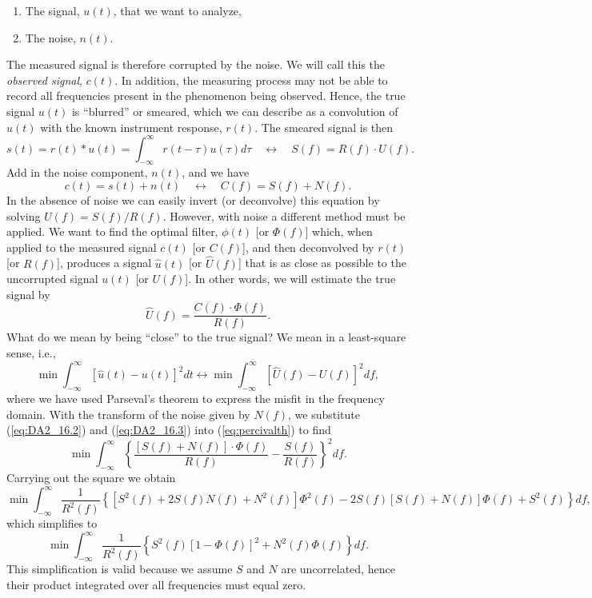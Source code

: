 \begin{enumerate}
\item The signal, $u(t)$, that we want to analyze,
\item The noise, $n(t)$.
\end{enumerate}
The measured signal is therefore corrupted by the noise. We will call this the \emph{observed signal},
$c(t)$. In addition, the measuring process may not be able to record all frequencies present in the phenomenon being observed.
Hence, the true signal $u(t)$ is ``blurred'' or smeared, which we can describe as a convolution
of $u(t)$ with the known instrument response, $r(t)$. The smeared signal is then
\begin{equation}
s(t)=r(t)*u(t)=\int^\infty_{-\infty} r(t-\tau)u(\tau)d \tau \quad \leftrightarrow \quad S(f)= R(f) \cdot U(f).
\end{equation}
Add in the noise component, $n(t)$, and we have
\begin{equation}
c(t)=s(t)+n(t)  \quad \leftrightarrow  \quad C(f)=S(f)+N(f).
\label{eq:DA2_16.2}
\end{equation}
In the absence of noise we can easily invert (or deconvolve) this equation by solving $U (f) =
S(f)/R(f)$. However, with noise a different method must be applied. We want to find
the optimal filter, $\phi(t)$ [or $\Phi(f)$] which, when applied to the measured signal $c(t)$ [or
$C(f)$], and then deconvolved by $r(t)$ [or $R(f)$], produces a signal $\hat{u}(t)$ [or $\hat{U}(f)$] that is as
close as possible to the uncorrupted signal $u(t)$ [or $U (f)$]. In other words, we will
estimate the true signal by
\begin{equation}
\hat{U}(f) = \frac{C(f) \cdot \Phi (f)}{R (f)}.
\label{eq:DA2_16.3}
\end{equation}
What do we mean by being ``close'' to the true signal? We mean in a least-square sense, i.e.,
\begin{equation}
\min \int^\infty _{- \infty} \left [ \hat{u} (t) - u(t) \right ]^2 dt \leftrightarrow \min \int^\infty _{- \infty}
\left [ \hat{U} (f) - U (f) \right ]^2 d f,
\label{eq:percivalth}
\end{equation}
where we have used Parseval's theorem to express the misfit in the frequency domain.
With the transform of the noise given by $N(f)$, we substitute (\ref{eq:DA2_16.2}) and (\ref{eq:DA2_16.3})
into (\ref{eq:percivalth}) to find
$$
\min \int^\infty _{- \infty} \left \{
\frac{\left [ S(f) + N (f) \right ] \cdot \Phi (f)}{R (f) }
- \frac{S (f)}{R(f)} \right \} ^2 d f.
$$
Carrying out the square we obtain
$$
\min \int^\infty _{- \infty}
\frac{1}{ R^2 (f)}
\left \{ [ S^2 (f) + 2S (f) N (f) + N^2 (f) ] \Phi ^2 (f) - 2S (f) [ S(f) + N (f)] \Phi (f) + S^2 (f) \right \} d f,
$$
which simplifies to
\begin{equation}
\min \int^\infty _{- \infty}
\frac{1}{ R^2 (f)} \left \{ S^2 (f) [ 1 - \Phi (f)]^2 + N^2 (f) \Phi (f) \right \} d f.
\label{eq:DA2_16.5}
\end{equation}
This simplification is valid because we assume $S$ and $N$ are uncorrelated, hence their product integrated over all
frequencies must equal zero.

